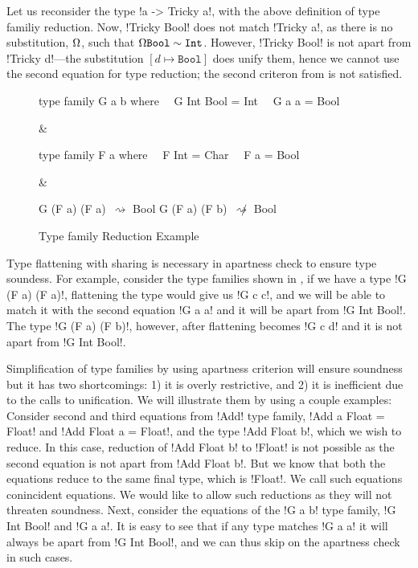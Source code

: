 \documentclass[format=acmsmall,manuscript,review,screen,nonacm,margin=1in,11pt]{acmart}
\begin{document}
Let us reconsider the type !a -> Tricky a!, with the above definition of type familiy reduction.
Now, !Tricky Bool! does not match !Tricky a!, as there is no substitution,
$\Omega$, such that $\Omega\texttt{Bool} \mathrel{\sim} \texttt{Int}$.
However, !Tricky Bool! is not apart from !Tricky d!---the substitution $[d\mapsto\texttt{Bool}]$ does unify them,
hence we cannot use the second equation for type reduction; the second criteron from 
is not satisfied.
\begin{figure}[ht]
  \centering\small
  \begin{tabularx}\textwidth{X X X}
\begin{code}^^J
type family G a b where^^J
\ \ G Int Bool = Int^^J
\ \ G a   a    = Bool^^J
\end{code}&
\begin{code}^^J
type family F a where^^J
\ \ F Int    = Char^^J
\ \ F a      = Bool^^J
\end{code}&
\begin{code}^^J
G (F a) (F a)\ $\mathrel{\rightsquigarrow}$ Bool^^J
G (F a) (F b)\ $\mathrel{\not\rightsquigarrow}$ Bool^^J
\end{code}
  \end{tabularx}
  \caption{Type family Reduction Example}
  \label{fig:ctf-red-ex}
\end{figure}

Type flattening with sharing is necessary in apartness check to ensure type soundess.
For example, consider the type families shown in ,
if we have a type !G (F a) (F a)!, flattening the type would give us !G c c!,
and we will be able to match it with the second equation !G a a! and it will
be apart from !G Int Bool!. The type !G (F a) (F b)!, however, after flattening
becomes !G c d! and it is not apart from !G Int Bool!.

Simplification of type families by using apartness criterion will ensure soundness
but it has two shortcomings: 1) it is overly restrictive, and 2) it is inefficient due to the calls to unification.
We will illustrate them by using a couple examples: Consider second and third equations from !Add! type family,
!Add a Float = Float! and !Add Float a = Float!, and the type !Add Float b!, which we wish to reduce.
In this case, reduction of !Add Float b! to !Float! is not possible as the second equation is not apart
from !Add Float b!. But we know that both the equations reduce to the same final type, which is !Float!.
We call such equations conincident equations. We would like to allow such reductions as they will not
threaten soundness. Next, consider the equations of the !G a b! type family, !G Int Bool! and !G a a!.
It is easy to see that if any type matches !G a a! it will always be apart from !G Int Bool!, and
we can thus skip on the apartness check in such cases.
\end{document}
